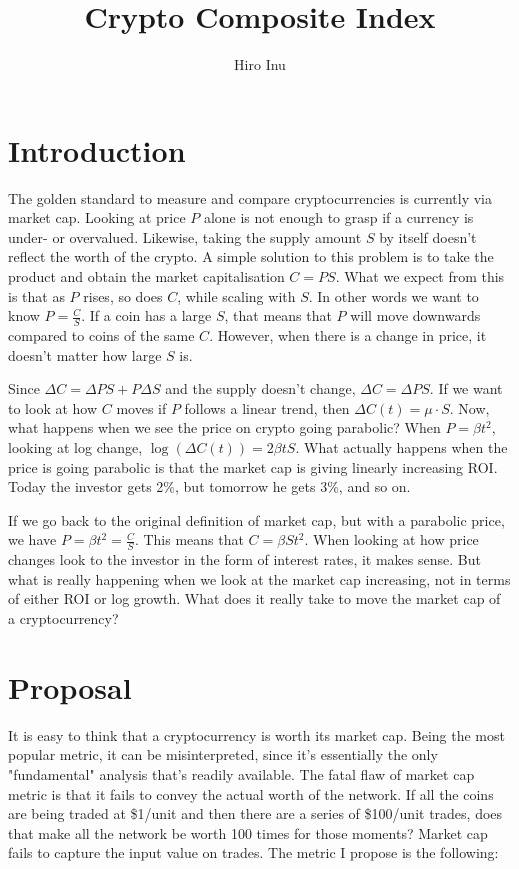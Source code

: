 \documentclass[11pt,a4paper]{article}
\title{Crypto Composite Index}
\author{Hiro Inu}
\begin{document}
 
\maketitle 
\section{Introduction} 

The golden standard to measure and compare cryptocurrencies is currently via market cap. Looking at price $P$ alone is not enough to grasp if a currency is under- or overvalued. Likewise, taking the supply amount ${S}$ by itself doesn't reflect the worth of the crypto. A simple solution to this problem is to take the product and obtain the market capitalisation $C = P  S$. What we expect from this is that as $P$ rises, so does $C$, while scaling with $S$. In other words we want to know $P = \frac{C}{S}$. If a coin has a large $S$, that means that $P$ will move downwards compared to coins of the same $C$. However, when there is a change in price, it doesn't matter how large $S$ is. 

Since $\Delta C = \Delta P  S +  P  \Delta S$ and the supply doesn't change, $\Delta C = \Delta P  S$. If we want to look at how $C$ moves if $P$ follows a linear trend, then $\Delta C(t) = \mu \cdot S$. Now, what happens when we see the price on crypto going parabolic? When $P = \beta t ^ 2$, looking at log change, $\log(\Delta C(t)) = 2 \beta t S$. What actually happens when the price is going parabolic is that the market cap is giving linearly increasing ROI. Today the investor gets 2\%, but tomorrow he gets 3\%, and so on. 

If we go back to the original definition of market cap, but with a parabolic price, we have $P = \beta t ^ 2 = \frac{C}{S}$. This means that $C = \beta S t ^ 2$. When looking at how price changes look to the investor in the form of interest rates, it makes sense. But what is really happening when we look at the market cap increasing, not in terms of either ROI or log growth. What does it really take to move the market cap of a cryptocurrency? 


\newpage

\section{Proposal}

It is easy to think that a cryptocurrency is worth its market cap. Being the most popular metric, it can be misinterpreted, since it's essentially the only "fundamental" analysis that's readily available. The fatal flaw of market cap metric is that it fails to convey the actual worth of the network. If all the coins are being traded at \$1/unit and then there are a series of \$100/unit trades, does that make all the network be worth 100 times for those moments? Market cap fails to capture the input value on trades. The metric I propose is the following:
\end{document}
